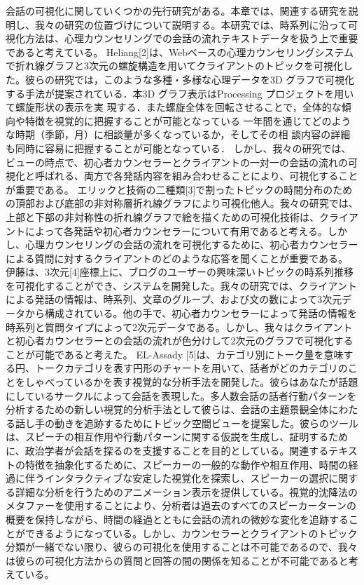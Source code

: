 \documentclass[shuuron]{kuee}
\begin{document}

会話の可視化に関していくつかの先行研究がある。本章では、関連する研究を説明し、我々の研究の位置づけについて説明する。本研究では、時系列に沿って可視化方法は、心理カウンセリングでの会話の流れテキストデータを扱う上で重要であると考えている。
Heliang[2]は、Webベースの心理カウンセリングシステムで折れ線グラフと3次元の螺旋構造を用いてクライアントのトピックを可視化した。彼らの研究では，このような多種・多様な心理データを3D グラフで可視化する手法が提案されている．本3D グラフ表示はProcessing プロジェクトを用いて螺旋形状の表示を実
現する．また螺旋全体を回転させることで，全体的な傾向や特徴を視覚的に把握することが可能となっている
一年間を通じてどのような時期（季節，月）に相談量が多くなっているか，そしてその相
談内容の詳細も同時に容易に把握することが可能となっている．
しかし、我々の研究では、ビューの時点で、初心者カウンセラーとクライアントの一対一の会話の流れの可視化と呼ばれる、両方で各発話内容を組み合わせることにより、可視化することが重要である。
 エリックと技術の二種類[3]で割ったトピックの時間分布のための頂部および底部の非対称層折れ線グラフにより可視化他人。我々の研究では、上部と下部の非対称性の折れ線グラフで絵を描くための可視化技術は、クライアントによって各発話や初心者カウンセラーについて有用であると考える。しかし、心理カウンセリングの会話の流れを可視化するために、初心者カウンセラーによる質問に対するクライアントのどのような応答を聞くことが重要である。
 伊藤は、3次元[4]座標上に、ブログのユーザーの興味深いトピックの時系列推移を可視化することができ、システムを開発した。我々の研究では、クライアントによる発話の情報は、時系列、文章のグループ、および文の数によって3次元データから構成されている。他の手で、初心者カウンセラーによって発話の情報を時系列と質問タイプによって2次元データである。しかし、我々はクライアントと初心者カウンセラーとの会話の流れが色分けして2次元のグラフで可視化することが可能であると考えた。
  EL-Assady [5]は、カテゴリ別にトーク量を意味する円、トークカテゴリを表す円形のチャートを用いて、話者がどのカテゴリのことをしゃべっているかを表す視覚的な分析手法を開発した。彼らはあなたが話題にしているサークルによって会話を表現した。多人数会話の話者行動パターンを分析するための新しい視覚的分析手法として彼らは、会話の主題景観全体にわたる話し手の動きを追跡するためにトピック空間ビューを提案した。彼らのツールは、スピーチの相互作用や行動パターンに関する仮説を生成し、証明するために、政治学者が会話を探るのを支援することを目的としている。関連するテキストの特徴を抽象化するために、スピーカーの一般的な動作や相互作用、時間の経過に伴うインタラクティブな安定した視覚化を探索し、スピーカーの選択に関する詳細な分析を行うためのアニメーション表示を提供している。視覚的沈降法のメタファーを使用することにより、分析者は過去のすべてのスピーカーターンの概要を保持しながら、時間の経過とともに会話の流れの微妙な変化を追跡することができるようになっている。しかし、カウンセラーとクライアントのトピック分類が一緒でない限り、彼らの可視化を使用することは不可能であるので、我々は彼らの可視化方法からの質問と回答の間の関係を知ることが不可能であると考えている。
\end{document}
